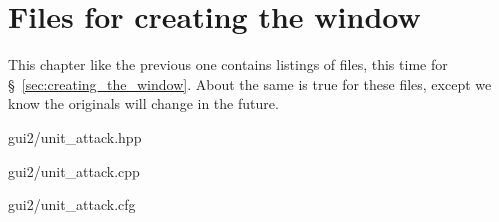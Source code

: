 \chapter{Files for creating the window}

This chapter like the previous one contains listings of files, this time for
\S~\ref{sec:creating_the_window}. About the same is true for these files, except
we know the originals will change in the future.


	{gui2/unit_attack.hpp}


	{gui2/unit_attack.cpp}


	{gui2/unit_attack.cfg}

